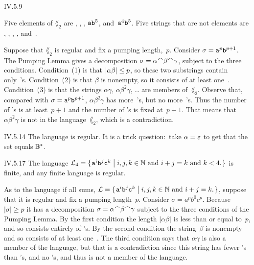 \begin{ans}{IV.5.9}
\begin{exparts}
\item Five elements of $\lang_2$ are , , ,
$\texttt{a}\texttt{b}^5$, and~$\texttt{a}^4\texttt{b}^5$.
Five strings that are not elements are
\emptystring, , , , and~.

Suppose that $\lang_2$ is regular and fix a pumping length,~$p$.
Consider $\sigma=\texttt{a}^p\texttt{b}^{p+1}$.
The Pumping Lemma gives a decomposition
$\sigma=\alpha\concat\beta\concat\gamma$, subject to the three conditions.
Condition~(1) is that $|\alpha\beta|\leq p$, so these two substrings
contain only~'s.
Condition~(2) is that $\beta$ is nonempty, so it consists of at least
one~.
Condition~(3) is that the strings
$\alpha\gamma$, $\alpha\beta^2\gamma$, \ldots{} are members of~$\lang_2$.
Observe that, compared with $\sigma=\texttt{a}^p\texttt{b}^{p+1}$,
$\alpha\beta^2\gamma$ has more~'s, but no more~'s.
Thus the number of 's is at least~$p+1$ and the number of 's
is fixed at~$p+1$.
That means that $\alpha\beta^2\gamma$ is not in the language~$\lang_2$,
which is a contradiction.
\end{exparts}
\end{ans}
%
%
%
%
%
\begin{ans}{IV.5.14}
The language is regular.
It is a trick question:~take $\alpha=\varepsilon$ to get that the set equals
${{\mathbb{B}}^{*}}$.
\end{ans}
%
%
%
\begin{ans}{IV.5.17}
The language $\lang_4=\set{\str{a}^i\str{b}^j\str{c}^k\suchthat \text{$i,j,k\in\N$ and $i+j=k$ and $k<4$.}}$ is finite, and any finite language is regular.

As to the language if all sums,
$\lang=\set{\str{a}^i\str{b}^j\str{c}^k\suchthat \text{$i,j,k\in\N$ and $i+j=k$.}}$,
suppose that it is regular and fix a pumping length~$p$.
Consider $\sigma=a^pb^0c^p$.
Because $|\sigma|\geq p$ it has a decomposition
$\sigma=\alpha\concat\beta\concat\gamma$ subject to the three conditions
of the Pumping Lemma.
By the first condition the length $|\alpha\beta|$ is less than or equal to~$p$,
and so consists entirely of 's.
By the second condition the string~$\beta$ is nonempty and so consists of at
least one~.
The third condition says that $\alpha\gamma$ is also a member of the language,
but that is a contradiction since this string has fewer 's than
's, and no 's, and thus is not a member of the language.
\end{ans}
